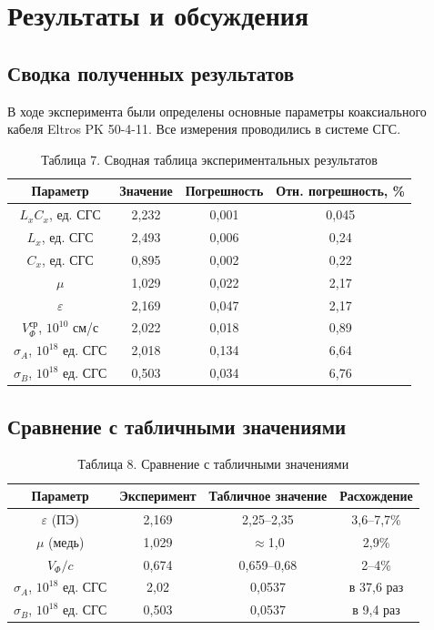\documentclass[a4paper]{article}
\begin{document}
\section{Результаты и обсуждения}

\subsection*{Сводка полученных результатов}

В ходе эксперимента были определены основные параметры коаксиального кабеля Eltros PK 50-4-11. Все измерения проводились в системе СГС.

\begin{table}[h!]
\centering
\begin{tabular}{|c|c|c|c|}
\hline
Параметр & Значение & Погрешность & Отн. погрешность, \% \\
\hline
$L_x C_x$, ед. СГС & 2,232 & 0,001 & 0,045 \\
$L_x$, ед. СГС & 2,493 & 0,006 & 0,24 \\
$C_x$, ед. СГС & 0,895 & 0,002 & 0,22 \\
$\mu$ & 1,029 & 0,022 & 2,17 \\
$\varepsilon$ & 2,169 & 0,047 & 2,17 \\
$V_\Phi^{ср}$, $10^{10}$ см/с & 2,022 & 0,018 & 0,89 \\
$\sigma_A$, $10^{18}$ ед. СГС & 2,018 & 0,134 & 6,64 \\
$\sigma_B$, $10^{18}$ ед. СГС & 0,503 & 0,034 & 6,76 \\
\hline
\end{tabular}
\caption{Таблица 7. Сводная таблица экспериментальных результатов}
\label{tab:summary}
\end{table}

\subsection*{Сравнение с табличными значениями}

\begin{table}[h!]
\centering
\begin{tabular}{|c|c|c|c|}
\hline
Параметр & Эксперимент & Табличное значение & Расхождение \\
\hline
$\varepsilon$ (ПЭ) & 2,169 & 2,25--2,35 & 3,6--7,7\% \\
$\mu$ (медь) & 1,029 & $\approx$1,0 & 2,9\% \\
$V_\Phi/c$ & 0,674 & 0,659--0,68 & 2--4\% \\
$\sigma_A$, $10^{18}$ ед. СГС & 2,02 & 0,0537 & в 37,6 раз \\
$\sigma_B$, $10^{18}$ ед. СГС & 0,503 & 0,0537 & в 9,4 раз \\
\hline
\end{tabular}
\caption{Таблица 8. Сравнение с табличными значениями}
\label{tab:comparison}
\end{table}
\end{document}
